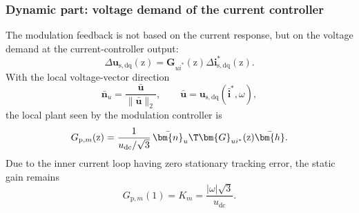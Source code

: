 
\begin{frame}
    \frametitle{Dynamic part: voltage demand of the current controller}
    The modulation feedback is not based on the current response, but on the voltage demand at the current-controller output:
    \begin{equation}
        \Delta \bm{u}_{\mathrm{s,dq}}(\mathrm{z})
        =
        \bm{G}_{u i^*}(\mathrm{z})\Delta \bm{i}_{\mathrm{s,dq}}^*(\mathrm{z}) .
    \end{equation}
    With the local voltage-vector direction
    \begin{equation}
        \bar{\bm{n}}_u =
        \frac{\bar{\bm{u}}}{\|\bar{\bm{u}}\|_2},
        \qquad
        \bar{\bm{u}}=\bm{u}_{\mathrm{s,dq}}(\bar{\bm{i}}^*,\omega),
    \end{equation}
    the local plant seen by the modulation controller is
    \begin{equation}
        G_{\mathrm{p},m}(\mathrm{z})
        =
        \frac{1}{u_{\mathrm{dc}}/\sqrt{3}}\,
        \bar{\bm{n}}_u\T\bm{G}_{u i^*}(\mathrm{z})\bar{\bm{h}}.
    \end{equation}
    Due to the inner current loop having zero stationary tracking error, the static gain remains
    \begin{equation}
        G_{\mathrm{p},m}(1)
        =
        K_{m}
        =
        \frac{|\omega|\sqrt{3}}{u_{\mathrm{dc}}} .
    \end{equation}
\end{frame}


